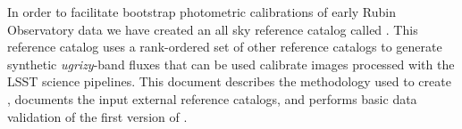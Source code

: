 In order to facilitate bootstrap photometric calibrations of early Rubin Observatory data we have created an all sky reference catalog called \monster.
This reference catalog uses a rank-ordered set of other reference catalogs to generate synthetic \textit{ugrizy}-band fluxes that can be used calibrate images processed with the LSST science pipelines.
This document describes the methodology used to create \monster, documents the input external reference catalogs, and performs basic data validation of the first version of \monster.